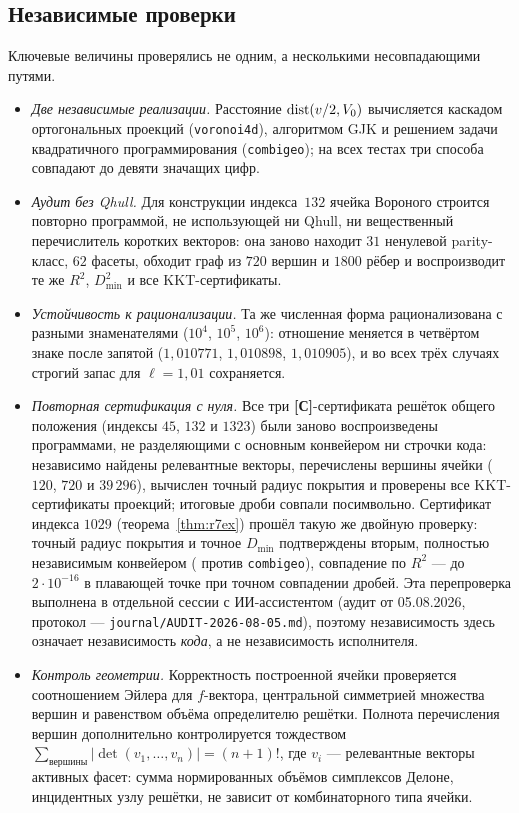 \subsection{Независимые проверки}

Ключевые величины проверялись не одним, а несколькими несовпадающими путями.

\begin{itemize}[leftmargin=1.4em,itemsep=2pt]
\item \emph{Две независимые реализации.} Расстояние
$\operatorname{dist}(v/2,V_0)$ вычисляется каскадом ортогональных проекций
(\texttt{voronoi4d}), алгоритмом GJK и решением задачи квадратичного
программирования (\texttt{combigeo}); на всех тестах три способа совпадают до
девяти значащих цифр.

\item \emph{Аудит без Qhull.} Для конструкции индекса~$132$ ячейка Вороного
строится повторно программой, не использующей ни Qhull, ни вещественный
перечислитель коротких векторов: она заново находит $31$ ненулевой
parity-класс, $62$ фасеты, обходит граф из $720$ вершин и $1800$ рёбер и
воспроизводит те же $R^2$, $D_{\min}^2$ и все KKT-сертификаты.

\item \emph{Устойчивость к рационализации.} Та же численная форма
рационализована с разными знаменателями ($10^4$, $10^5$, $10^6$): отношение
меняется в четвёртом знаке после запятой ($1{,}010771$, $1{,}010898$,
$1{,}010905$), и во всех трёх случаях строгий запас для $\ell=1{,}01$
сохраняется.

\item \emph{Повторная сертификация с нуля.} Все три \textbf{[С]}-сертификата
решёток общего положения (индексы $45$, $132$ и $1323$) были заново
воспроизведены программами, не
разделяющими с основным конвейером ни строчки кода: независимо найдены релевантные векторы, перечислены вершины ячейки
($120$, $720$ и $39\,296$), вычислен точный радиус покрытия и проверены все
KKT-сертификаты проекций; итоговые дроби совпали посимвольно. Сертификат
индекса $1029$ (теорема~\ref{thm:r7ex}) прошёл такую же двойную проверку:
точный радиус покрытия и точное $D_{\min}$ подтверждены вторым, полностью
независимым конвейером
( против
\texttt{combigeo}), совпадение по $R^2$ --- до $2\cdot10^{-16}$ в
плавающей точке при точном совпадении дробей. Эта
перепроверка выполнена в отдельной сессии с ИИ-ассистентом (аудит от
05.08.2026, протокол --- \texttt{journal/AUDIT-2026-08-05.md}), поэтому
независимость здесь означает независимость \emph{кода}, а не независимость
исполнителя.

\item \emph{Контроль геометрии.} Корректность построенной ячейки проверяется
соотношением Эйлера для $f$-вектора, центральной симметрией множества вершин и
равенством объёма определителю решётки. Полнота перечисления вершин
дополнительно контролируется тождеством
$\sum_{\text{вершины}}|\det(v_1,\dots,v_n)|=(n+1)!$, где $v_i$ --- релевантные
векторы активных фасет: сумма нормированных объёмов симплексов Делоне,
инцидентных узлу решётки, не зависит от комбинаторного типа ячейки.
\end{itemize}

